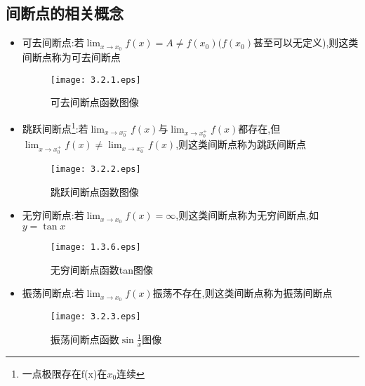 \documentclass[10pt, a4paper, oneside, UTF8]{ctexbook}
\begin{document}
\begin{sloppypar}
    \subsection{间断点的相关概念}
    \begin{itemize}
        \item 可去间断点:若$\lim_{x\to x_0}f(x)=A\neq f(x_0)(f(x_0)$甚至可以无定义),则这类间断点称为可去间断点
              \begin{figure}[H]
                  \centering \texttt{[image: 3.2.1.eps]} \caption{可去间断点函数图像}
              \end{figure}
        \item 跳跃间断点\footnote{一点极限存在\neq f(x)在$x_0$连续}:若$\lim_{x\to x_0^-}f(x)$与$\lim_{x\to x_0^+}f(x)$都存在,但$\lim_{x\to x_0^+}f(x)\neq\lim_{x\to x_0^-}f(x)$,则这类间断点称为跳跃间断点
              \begin{figure}[H]
                  \centering \texttt{[image: 3.2.2.eps]} \caption{跳跃间断点函数图像}
              \end{figure}
        \item 无穷间断点:若$\lim_{x\to x_0}f(x)=\infty$,则这类间断点称为无穷间断点,如$y=\tan x$
              \begin{figure}[H]
                  \centering \texttt{[image: 1.3.6.eps]} \caption{无穷间断点函数tan图像}
              \end{figure}
        \item 振荡间断点:若$\lim_{x\to x_0}f(x)$振荡不存在,则这类间断点称为振荡间断点
              \begin{figure}[H]
                  \centering \texttt{[image: 3.2.3.eps]} \caption{振荡间断点函数$\sin \frac{1}{x}$图像}
              \end{figure}
    \end{itemize}

\end{sloppypar}
\end{document}
